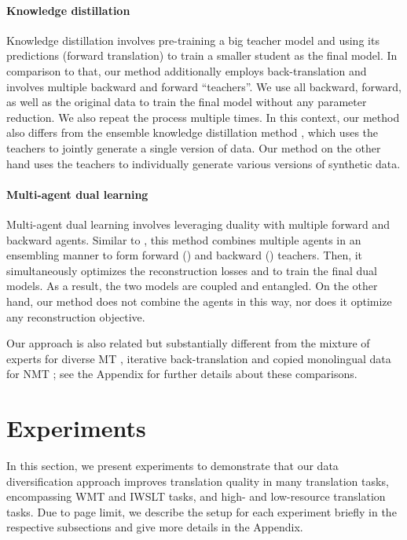 \documentclass{article}
\begin{document}
\vspace{-0.5em}
\paragraph{Knowledge distillation} Knowledge distillation \citep{knowledge_distill_kim_rush_2016,bornagain_pmlr-v80-furlanello18a} involves pre-training a {big teacher} model and using its predictions (forward translation) to train a {smaller student} as the final model. In comparison to that, our method additionally employs back-translation and involves multiple backward and forward ``teachers''. We use all backward, forward, as well as the original data to train the final model without any  parameter reduction. We also repeat the process multiple times. 
 In this context, our method also differs from the ensemble knowledge distillation method  \citep{ensemble_distill_freitag2017}, which uses the teachers to jointly generate a single version of data. Our method on the other hand uses the teachers to individually generate various versions of synthetic data. 

\vspace{-0.5em}
\paragraph{Multi-agent dual learning} Multi-agent dual learning \citep{multiagent} involves leveraging duality with multiple forward and backward agents. Similar to \citep{ensemble_distill_freitag2017}, this method combines multiple agents in an ensembling manner to form forward () and backward () teachers. Then, it simultaneously optimizes the reconstruction losses  and  to train the final dual models. As a result, the two models are coupled and entangled. On the other hand, our method does not combine the agents in this way, nor does it optimize any reconstruction objective.

Our approach is also related but substantially different from the mixture of experts for diverse MT \citep{mixture_model_nmt_shen2019}, iterative back-translation \citep{iterative-hoang-etal-2018} and copied monolingual data for NMT \citep{copied-currey-etal-2017}; 
see the Appendix for further details about these comparisons.


 \label{sec:data-diver}

\section{Experiments} \label{sec:experiments}
In this section, we present experiments to demonstrate that our data diversification approach improves translation quality in many translation tasks, encompassing WMT and IWSLT tasks, and high- and low-resource translation tasks. {Due to page limit, we  describe the setup for each experiment briefly in the respective subsections and give more details in the Appendix.} 
\end{document}
